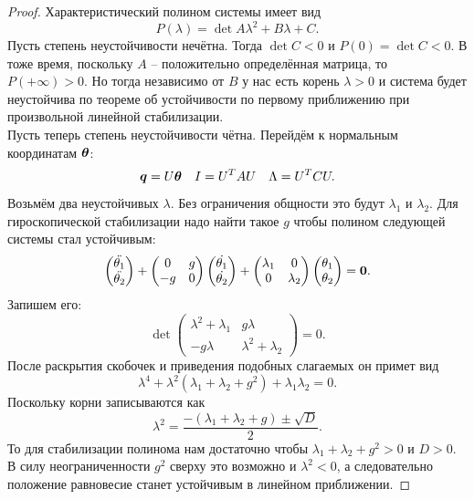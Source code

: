 \begin{proof}
    Характеристический полином системы имеет вид
    \[
        P(\lambda) = \det A \lambda^2 + B \lambda + C.
    \]
    Пусть степень неустойчивости нечётна.
    Тогда $\det C < 0$ и $P(0) = \det C < 0$.
    В тоже время, поскольку $A$ -- положительно определённая матрица, то $P(+\infty) > 0$.
    Но тогда независимо от $B$ у нас есть корень $\lambda > 0$ и система будет неустойчива по теореме об устойчивости по первому приближению при произвольной линейной стабилизации. \\
    Пусть теперь степень неустойчивости чётна.
    Перейдём к нормальным координатам $\boldsymbol{\theta}$:
    \[
        \boldsymbol{q} = U\boldsymbol{\theta} \quad I = U^{T}AU \quad \Lambda = U^T C U.
    \]
    Возьмём два неустойчивых $\lambda$.
    Без ограничения общности это будут $\lambda_1$ и $\lambda_2$.
    Для гироскопической стабилизации надо найти такое $g$ чтобы полином следующей системы стал устойчивым:
    \[
        \begin{pmatrix*} \ddot{\theta_1} \\ \ddot{\theta_2}
        \end{pmatrix*} + \begin{pmatrix*} 0 & g \\ -g & 0
        \end{pmatrix*} \begin{pmatrix*} \dot{\theta_1} \\ \dot{\theta_2}
        \end{pmatrix*} + \begin{pmatrix*} \lambda_1 & 0 \\ 0 & \lambda_2
        \end{pmatrix*} \begin{pmatrix*} \theta_1 \\ \theta_2
        \end{pmatrix*} = \bt{0}.
    \]
    Запишем его:
    \[
        \det \begin{pmatrix*} \lambda^2 + \lambda_1 & g\lambda \\ -g\lambda & \lambda^2 + \lambda_2
        \end{pmatrix*} = 0.
    \]
    После раскрытия скобочек и приведения подобных слагаемых он примет вид
    \[
        \lambda^4 + \lambda^2(\lambda_1 + \lambda_2 + g^2) + \lambda_1\lambda_2 = 0.
    \]
    Поскольку корни записываются как
    \[
        \lambda^2 = \dfrac{-(\lambda_1 + \lambda_2 + g) \pm \sqrt{D}}{2}.
    \]
    То для стабилизации полинома нам достаточно чтобы $\lambda_1 + \lambda_2 + g^2 > 0$ и $D > 0$.
    В силу неограниченности $g^2$ сверху это возможно и $\lambda^2 < 0$, а следовательно положение равновесие станет устойчивым в линейном приближении.
\end{proof}
